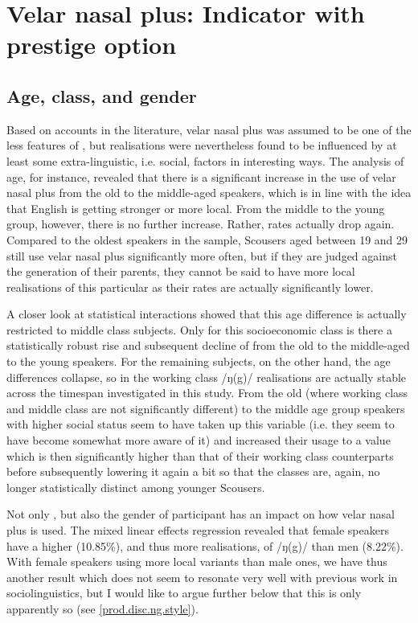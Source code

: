 \section{Velar nasal plus: Indicator with prestige option}
\label{prod.disc.ng}

\subsection{Age, class, and gender}
\label{prod.disc.ng.social}

Based on accounts in the literature, velar nasal plus was assumed to be one of the less  features of , but realisations were nevertheless found to be influenced by at least some extra-linguistic, i.e. social, factors in interesting ways.
The analysis of age, for instance, revealed that there is a significant increase in the use of velar nasal plus from the old to the middle-aged speakers, which is in line with the idea that  English is getting stronger or more local.
From the middle to the young group, however, there is no further increase.
Rather,  rates actually drop again.
Compared to the oldest speakers in the sample, Scousers aged between 19 and 29 still use velar nasal plus significantly more often, but if they are judged against the generation of their parents, they cannot be said to have more local realisations of this particular  as their rates are actually significantly lower.

A closer look at statistical interactions showed that this age difference is actually restricted to middle class subjects.
Only for this socioeconomic class is there a statistically robust rise and subsequent decline of  from the old to the middle-aged to the young speakers.
For the remaining subjects, on the other hand, the age differences collapse, so in the working class /ŋ(g)/ realisations are actually stable across the timespan investigated in this study.
From the old (where working class and middle class are not significantly different) to the middle age group speakers with higher social status seem to have taken up this variable (i.e. they seem to have become somewhat more aware of it) and increased their usage to a value which is then significantly higher than that of their working class counterparts before subsequently lowering it again a bit so that the classes are, again, no longer statistically distinct among younger Scousers.

Not only , but also the gender of participant has an impact on how velar nasal plus is used.
The mixed linear effects regression revealed that female speakers have a higher  (10.85\%), and thus more  realisations, of /ŋ(g)/ than men (8.22\%).
With female speakers using more local variants than male ones, we have thus another result which does not seem to resonate very well with previous work in sociolinguistics, but I would like to argue further below that this is only apparently so (see \ref{prod.disc.ng.style}).

